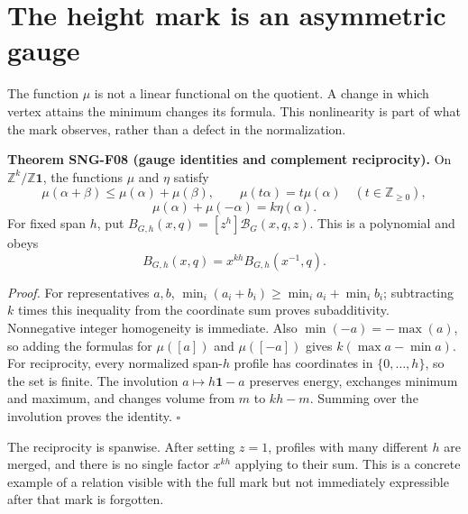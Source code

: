 \documentclass[
  11pt,
  a4paper,
]{report}
\begin{document}
\hypertarget{the-height-mark-is-an-asymmetric-gauge}{%
\section{The height mark is an asymmetric
gauge}\label{the-height-mark-is-an-asymmetric-gauge}}

The function \(\mu\) is not a linear functional on the quotient. A
change in which vertex attains the minimum changes its formula. This
nonlinearity is part of what the mark observes, rather than a defect in
the normalization.

\textbf{Theorem SNG-F08 (gauge identities and complement reciprocity).}
On \(\mathbb Z^k/\mathbb Z\mathbf1\), the functions \(\mu\) and \(\eta\)
satisfy \[
\mu(\alpha+\beta)\le\mu(\alpha)+\mu(\beta),
\qquad \mu(t\alpha)=t\mu(\alpha)\quad(t\in\mathbb Z_{\ge0}),
\] \[
\mu(\alpha)+\mu(-\alpha)=k\eta(\alpha).
\] For fixed span \(h\), put \(B_{G,h}(x,q)=[z^h]\mathcal B_G(x,q,z)\).
This is a polynomial and obeys \[
B_{G,h}(x,q)=x^{kh}B_{G,h}(x^{-1},q).
\]

\emph{Proof.} For representatives \(a,b\),
\(\min_i(a_i+b_i)\ge\min_i a_i+\min_i b_i\); subtracting \(k\) times
this inequality from the coordinate sum proves subadditivity.
Nonnegative integer homogeneity is immediate. Also
\(\min(-a)=-\max(a)\), so adding the formulas for \(\mu([a])\) and
\(\mu([-a])\) gives \(k(\max a-\min a)\). For reciprocity, every
normalized span-\(h\) profile has coordinates in \(\{0,\ldots,h\}\), so
the set is finite. The involution \(a\mapsto h\mathbf1-a\) preserves
energy, exchanges minimum and maximum, and changes volume from \(m\) to
\(kh-m\). Summing over the involution proves the identity. \(\square\)

The reciprocity is spanwise. After setting \(z=1\), profiles with many
different \(h\) are merged, and there is no single factor \(x^{kh}\)
applying to their sum. This is a concrete example of a relation visible
with the full mark but not immediately expressible after that mark is
forgotten.
\end{document}
